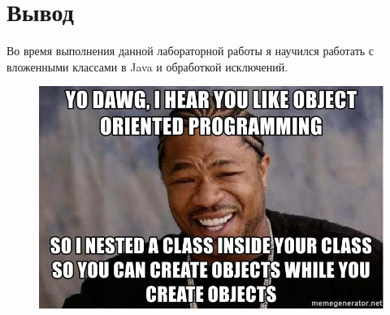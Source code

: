 \section{Вывод}
Во время выполнения данной лабораторной работы я научился работать с
вложенными классами в Java и обработкой исключений.

\begin{figure}[hb]
    \centering
    \includegraphics[width=\textwidth]{img/nested_meme.jpg}
\end{figure}